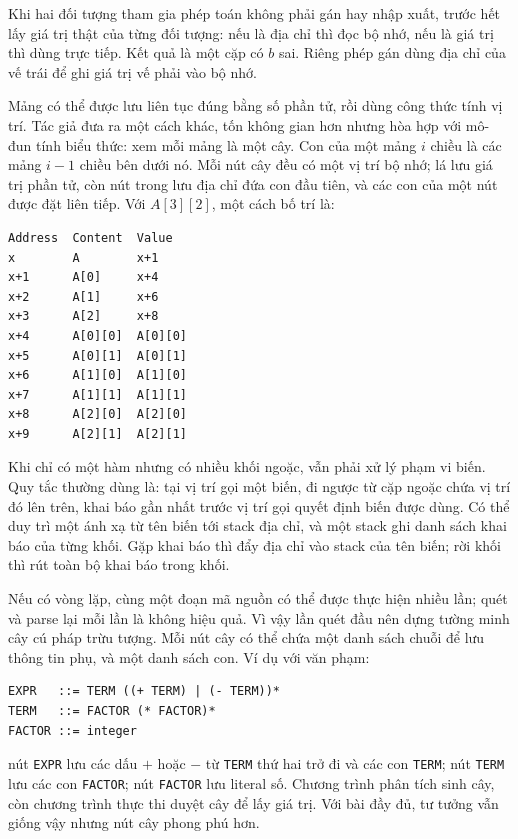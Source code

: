 \documentclass[11pt]{article}
\begin{document}
Khi hai đối tượng tham gia phép toán không phải gán hay nhập xuất, trước hết lấy
giá trị thật của từng đối tượng: nếu là địa chỉ thì đọc bộ nhớ, nếu là giá trị
thì dùng trực tiếp. Kết quả là một cặp có \(b\) sai. Riêng phép gán dùng địa chỉ
của vế trái để ghi giá trị vế phải vào bộ nhớ.

Mảng có thể được lưu liên tục đúng bằng số phần tử, rồi dùng công thức tính vị
trí. Tác giả đưa ra một cách khác, tốn không gian hơn nhưng hòa hợp với mô-đun
tính biểu thức: xem mỗi mảng là một cây. Con của một mảng \(i\) chiều là các
mảng \(i-1\) chiều bên dưới nó. Mỗi nút cây đều có một vị trí bộ nhớ; lá lưu
giá trị phần tử, còn nút trong lưu địa chỉ đứa con đầu tiên, và các con của một
nút được đặt liên tiếp. Với \(A[3][2]\), một cách bố trí là:

\begin{verbatim}
Address  Content  Value
x        A        x+1
x+1      A[0]     x+4
x+2      A[1]     x+6
x+3      A[2]     x+8
x+4      A[0][0]  A[0][0]
x+5      A[0][1]  A[0][1]
x+6      A[1][0]  A[1][0]
x+7      A[1][1]  A[1][1]
x+8      A[2][0]  A[2][0]
x+9      A[2][1]  A[2][1]
\end{verbatim}

Khi chỉ có một hàm nhưng có nhiều khối ngoặc, vẫn phải xử lý phạm vi biến. Quy
tắc thường dùng là: tại vị trí gọi một biến, đi ngược từ cặp ngoặc chứa vị trí
đó lên trên, khai báo gần nhất trước vị trí gọi quyết định biến được dùng. Có
thể duy trì một ánh xạ từ tên biến tới stack địa chỉ, và một stack ghi danh
sách khai báo của từng khối. Gặp khai báo thì đẩy địa chỉ vào stack của tên
biến; rời khối thì rút toàn bộ khai báo trong khối.

Nếu có vòng lặp, cùng một đoạn mã nguồn có thể được thực hiện nhiều lần; quét và
parse lại mỗi lần là không hiệu quả. Vì vậy lần quét đầu nên dựng tường minh
cây cú pháp trừu tượng. Mỗi nút cây có thể chứa một danh sách chuỗi để lưu thông
tin phụ, và một danh sách con. Ví dụ với văn phạm:

\begin{verbatim}
EXPR   ::= TERM ((+ TERM) | (- TERM))*
TERM   ::= FACTOR (* FACTOR)*
FACTOR ::= integer
\end{verbatim}

nút \texttt{EXPR} lưu các dấu \(+\) hoặc \(-\) từ \texttt{TERM} thứ hai trở đi
và các con \texttt{TERM}; nút \texttt{TERM} lưu các con \texttt{FACTOR}; nút
\texttt{FACTOR} lưu literal số. Chương trình phân tích sinh cây, còn chương
trình thực thi duyệt cây để lấy giá trị. Với bài đầy đủ, tư tưởng vẫn giống vậy
nhưng nút cây phong phú hơn.
\end{document}
